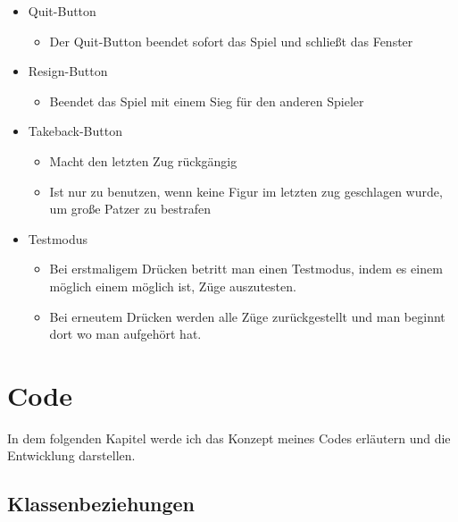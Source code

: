 \documentclass[a4paper, 10pt]{scrartcl}
\begin{document}
\begin{itemize}
        \item \glqq Quit\grqq-Button
        \begin{itemize}
                \item Der Quit-Button beendet sofort das Spiel und schließt das Fenster
        \end{itemize}
        \item \glqq Resign\grqq-Button
        \begin{itemize}
                \item Beendet das Spiel mit einem Sieg für den anderen Spieler
        \end{itemize}
        \item \glqq Takeback\grqq-Button
        \begin{itemize}
                \item Macht den letzten Zug rückgängig
                \item Ist nur zu benutzen, wenn keine Figur im 
                letzten zug geschlagen wurde, um große Patzer zu bestrafen
        \end{itemize}
        \item \glqq Testmodus\grqq
        \begin{itemize}
                \item Bei erstmaligem Drücken betritt man einen Testmodus, indem es einem möglich
                einem möglich ist, Züge auszutesten.
                \item Bei erneutem Drücken werden alle Züge zurückgestellt und man beginnt dort
                wo man aufgehört hat.
        \end{itemize}
\end{itemize}


\pagebreak
\section{Code}
In dem folgenden Kapitel werde ich das Konzept meines Codes erläutern und die Entwicklung darstellen. 


\subsection{Klassenbeziehungen}
\end{document}
